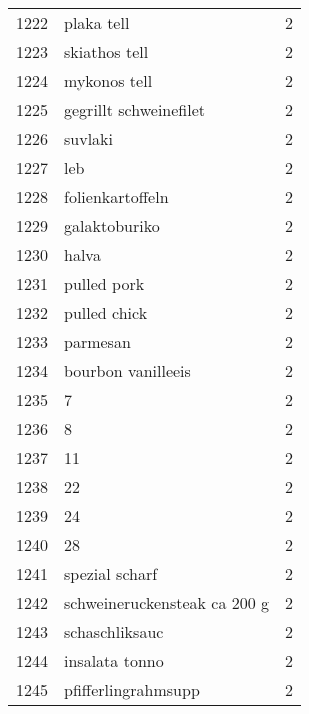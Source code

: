 \begin{tabular}{llr}
1222 &                                         plaka tell &      2 \\
1223 &                                      skiathos tell &      2 \\
1224 &                                       mykonos tell &      2 \\
1225 &                             gegrillt schweinefilet &      2 \\
1226 &                                            suvlaki &      2 \\
1227 &                                                leb &      2 \\
1228 &                                   folienkartoffeln &      2 \\
1229 &                                      galaktoburiko &      2 \\
1230 &                                              halva &      2 \\
1231 &                                        pulled pork &      2 \\
1232 &                                       pulled chick &      2 \\
1233 &                                           parmesan &      2 \\
1234 &                                 bourbon vanilleeis &      2 \\
1235 &                                                  7 &      2 \\
1236 &                                                  8 &      2 \\
1237 &                                                 11 &      2 \\
1238 &                                                 22 &      2 \\
1239 &                                                 24 &      2 \\
1240 &                                                 28 &      2 \\
1241 &                                     spezial scharf &      2 \\
1242 &                       schweineruckensteak ca 200 g &      2 \\
1243 &                                     schaschliksauc &      2 \\
1244 &                                     insalata tonno &      2 \\
1245 &                                pfifferlingrahmsupp &      2 \\

\end{tabular}
